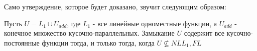 \documentclass[main.tex]{subfiles}
\begin{document}
Само утверждение, которое будет доказано, звучит следующим образом:
\begin{theorem} \label{th:main}
  Пусть $U = L_1 \cup U_{add}$, где $L_1$ - все линейные одноместные функции, а $U_{add}$ - конечное множество кусочно-параллельных.
  Замыкание $U$ содержит все кусочно-постоянные функции тогда, и только тогда, когда $U \not\subseteq NLL_1, FL$
\end{theorem}
\end{document}
